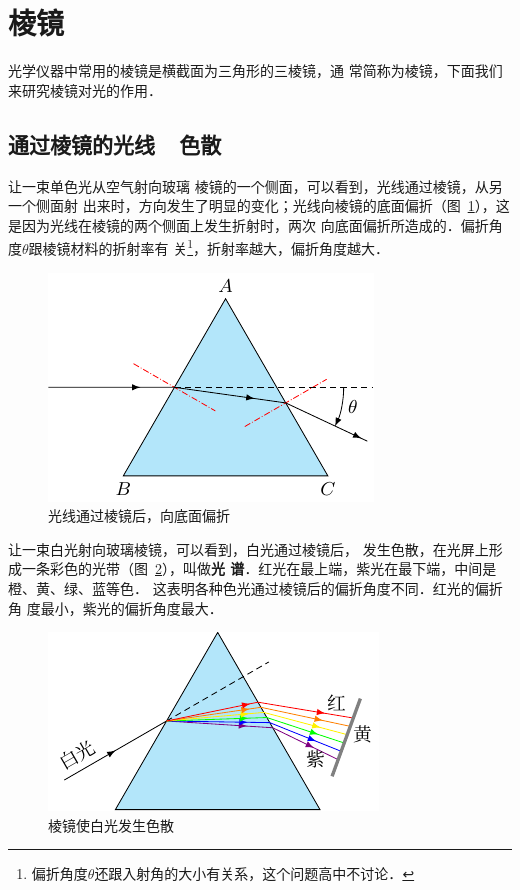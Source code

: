 \section{棱镜}

光学仪器中常用的棱镜是横截面为三角形的三棱镜，通
常简称为棱镜，下面我们来研究棱镜对光的作用．

\subsection{通过棱镜的光线~~色散}

让一束单色光从空气射向玻璃
棱镜的一个侧面，可以看到，光线通过棱镜，从另一个侧面射
出来时，方向发生了明显的变化；光线向棱镜的底面偏折（图~\ref{fig_C_5-31}），这是因为光线在棱镜的两个侧面上发生折射时，两次
向底面偏折所造成的．偏折角度$\theta$跟棱镜材料的折射率有
关\footnote{偏折角度$\theta$还跟入射角的大小有关系，这个问题高中不讨论．}，折射率越大，偏折角度越大．
\begin{figure}[htbp]
    \centering
    \includegraphics{fig/C/5-31.pdf}
    \caption{光线通过棱镜后，向底面偏折}\label{fig_C_5-31}
\end{figure}

让一束白光射向玻璃棱镜，可以看到，白光通过棱镜后，
发生色散，在光屏上形成一条彩色的光带（图~\ref{fig_C_5-32}），叫做\textbf{光
谱}．红光在最上端，紫光在最下端，中间是橙、黄、绿、蓝等色．
这表明各种色光通过棱镜后的偏折角度不同．红光的偏折角
度最小，紫光的偏折角度最大．
\begin{figure}[htbp]
    \centering
    \includegraphics{fig/C/5-32.pdf}
    \caption{棱镜使白光发生色散}\label{fig_C_5-32}
\end{figure}

